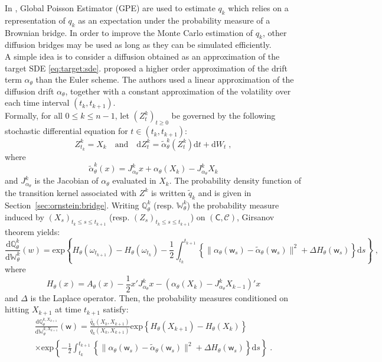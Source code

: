 \documentclass[12pt]{article}
\newcommand{\rmd}{\mathrm{d}}
\newcommand{\eqsp}{\;}
\newcommand{\1}{\mathrm{1}}
\newcommand{\qk}{q_{k}}
\newcommand{\Oz}{Z}%
\newcommand{\Jk}{J_{\alpha_\theta}^k}%
\newcommand{\mw}{\mathsf{w}}%
\begin{document}
In \cite{olsson:strojby:2011},  Global Poisson Estimator (GPE) are used to estimate $\qk$ which relies on a representation of $\qk$ as an expectation under the probability measure of a Brownian bridge. 
In order to improve the Monte Carlo estimation of $\qk$,  other diffusion bridges may be used as long as they can be simulated efficiently.\\ 
A simple idea is to consider a diffusion obtained as an approximation of the target SDE \eqref{eq:target:sde}. 
\cite{ozaki:1992,shoji:ozaki:1998} proposed a higher order approximation of the drift term $\alpha_{\theta}$ than the Euler scheme. 
The authors used a linear approximation of the diffusion drift $\alpha_{\theta}$, together with a constant approximation of the volatility over each time interval $(t_{k},t_{k+1})$.\\ 
Formally, for all $0\le k\le n-1$, let $(Z^{k}_t)_{t\ge 0}$ be governed by the following stochastic differential equation for $t\in(t_{k},t_{k+1})$:
\begin{equation}
\label{eq:SDE:Ozaki}
\Oz^k_{t_{k}} = X_{k}\quad\mbox{and}\quad\rmd \Oz^k_t = \widetilde{\alpha}^k_{\theta}(\Oz^k_t)\rmd t + \rmd W_t\eqsp,
\end{equation}
where
\[
\widetilde{\alpha}^k_{\theta}(x) = \Jk x + \alpha_{\theta}(X_{k}) - \Jk X_{k}
\]
and $\Jk$ is the Jacobian of $\alpha_{\theta}$ evaluated in $X_k$. The probability density function of the transition kernel associated with $\Oz^k$ is written $\widetilde{q}_k$ and is given in Section~\ref{sec:ornstein:bridge}.
Writing $\mathbb{Q}^k_{\theta}$ (resp. $\mathbb{W}^{k}_{\theta}$) the probability measure induced by $(X_s)_{t_{k}\le s\le t_{k+1}}$  (resp. $(\Oz_s)_{t_{k}\le s\le t_{k+1}}$) on $(\mathsf{C},\mathcal{C})$, Girsanov theorem yields:
\[
\frac{\rmd \mathbb{Q}^k_{\theta}}{\rmd \mathbb{W}^{k}_{\theta}}(w) = \mathrm{exp}\left\{H_{\theta}(\omega_{t_{k+1}}) - H_{\theta}(\omega_{t_{k}}) - \frac{1}{2}\int_{t_{k}}^{t_{k+1}}\left\{\|\alpha_{\theta}(\mw_s)-\widetilde{\alpha}_{\theta}(\mw_s)\|^2+\Delta H_{\theta}(\mw_s)\right\}\rmd s\right\}\eqsp,
\]
where 
\[
H_{\theta}(x) = A_{\theta}(x) - \frac{1}{2}x'\Jk x- (\alpha_{\theta}(X_{k}) - \Jk X_{k-1})'x
\]
and $\Delta$ is the Laplace operator. Then, the probability measures conditioned on hitting $X_{k+1}$ at time $t_{k+1}$ satisfy:
\begin{multline}
\label{eq:Girsanov}
\frac{\rmd \mathbb{Q}^{k,X_{k+1}}_{\theta}}{\rmd \mathbb{W}^{k,X_{k+1}}_{\theta}}(\mw) = \frac{\widetilde{\qk}(X_{k},X_{k+1})}{\qk (X_{k},X_{k+1}) }\mathrm{exp}\left\{H_{\theta}(X_{k+1}) - H_{\theta}(X_{k})\right\} \\
\times \mathrm{exp}\left\{- \frac{1}{2}\int_{t_{k}}^{t_{k+1}}\left\{\|\alpha_{\theta}(\mw_s)-\widetilde{\alpha}_{\theta}(\mw_s)\|^2+\Delta H_{\theta}(\mw_s)\right\}\rmd s\right\}\eqsp.
\end{multline}
\end{document}
